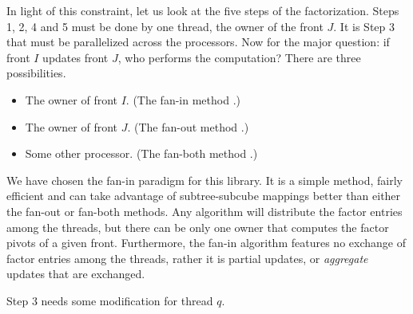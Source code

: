 In light of this constraint, let us look at the five steps of the
factorization.
Steps 1, 2, 4 and 5 must be done by one thread, the owner of the
front $J$.
It is Step 3 that must be parallelized across the processors.
Now for the major question: if front $I$ updates front $J$,
who performs the computation? There are three possibilities.
\begin{itemize}
\item
The owner of front $I$. (The fan-in method 
\cite{ash90-fan-in}.)
\item
The owner of front $J$. (The fan-out method 
\cite{geo87-fan-out}.)
\item
Some other processor. (The fan-both method
\cite{ash93-fan-both}.)
\end{itemize}
We have chosen the fan-in paradigm for this library.
It is a simple method, fairly efficient and can take advantage of
subtree-subcube mappings \cite{geo87-fan-out} better than either
the fan-out or fan-both methods.
Any algorithm will distribute the factor entries among the threads,
but there can be only one owner that computes
the factor pivots of a given front.
Furthermore, the fan-in algorithm features no exchange of factor
entries among the threads, rather it is partial updates, or
{\it aggregate} updates that are exchanged.
\par
Step 3 needs some modification for thread $q$.

